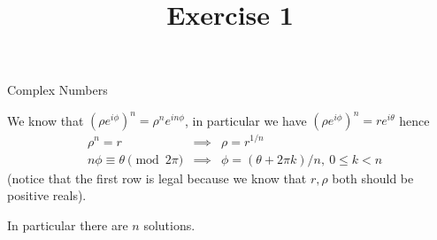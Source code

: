 

\usepackage{skak}
\usepackage{relsize}
\usepackage{graphicx}
\usepackage{mathtools}

\usepackage{textcomp}
\usepackage{bbding}

\usepackage{soul}

\newcommand{\flower}{\text{\scalebox{0.75}{\raisebox{-0.7ex}{
				\rotatebox{90}{\textleaf}\hspace{-0.3em}
				\scalebox{0.7}{\textleaf}\hspace{-1.35em}
				\raisebox{1ex}{\scalebox{0.8}{\FiveFlowerOpen}}
}}}}
\newcommand{\ei}[1]{e^{i#1}}


\title{Exercise 1}

\maketitle
{\Large Complex Numbers}
\begin{cExercise}[][][author]
	We know that $(\rho \ei{\phi})^n=\rho^n \ei{n\phi}$, in particular we have $(\rho \ei{\phi})^n=r\ei{\theta}$ hence
	\begin{align*}
		&\rho^n=r&\implies&\rho=r^{1/n}\\
		&n\phi\equiv \theta\pmod {2\pi}&\implies& \phi=(\theta+2\pi k)/n,\ 0\le k<n
	\end{align*}
	(notice that the first row is legal because we know that $r,\rho$ both should be positive reals).
	
	In particular there are $n$ solutions.
\end{cExercise}

